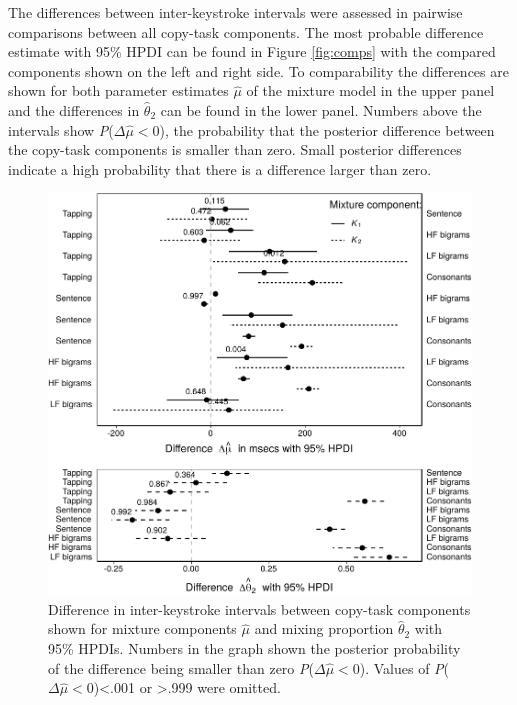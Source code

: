 \documentclass[,man,floatsintext]{apa6}
\begin{document}
The differences between inter-keystroke intervals were assessed in pairwise comparisons between all copy-task components. The most probable difference estimate with 95\% HPDI can be found in Figure \ref{fig:comps} with the compared components shown on the left and right side. To comparability the differences are shown for both parameter estimates \(\hat\mu\) of the mixture model in the upper panel and the differences in \(\hat\theta_2\) can be found in the lower panel. Numbers above the intervals show \textit{P}(\(\Delta\hat\mu<0\)), the probability that the posterior difference between the copy-task components is smaller than zero. Small posterior differences indicate a high probability that there is a difference larger than zero.

\begin{figure}[!h]

{\centering \includegraphics{ct_files/figure-latex/fig5-1} 

}

\caption{\label{fig:comps}Difference in inter-keystroke intervals between copy-task components shown for mixture components $\hat\mu$ and mixing proportion $\hat{\theta}_2$ with 95\% HPDIs. Numbers in the graph shown the posterior probability of the difference being smaller than zero \textit{P}($\Delta\hat\mu<0$). Values of \textit{P}($\Delta\hat\mu<0$)<.001 or >.999 were omitted.}\label{fig:fig5}
\end{figure}
\end{document}
